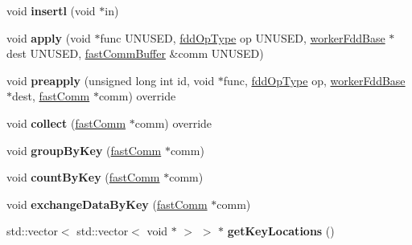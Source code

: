 \begin{DoxyCompactItemize}
void {\bfseries insertl} (void $\ast$in)
\item 
\hypertarget{classfaster_1_1workerFdd_a7b54fa501fd3cd31a27b95cc55b6235a}{}\label{classfaster_1_1workerFdd_a7b54fa501fd3cd31a27b95cc55b6235a} 
void {\bfseries apply} (void $\ast$func U\+N\+U\+S\+ED, \hyperlink{namespacefaster_a64379512d12d41c6e58f176939abfd80}{fdd\+Op\+Type} op U\+N\+U\+S\+ED, \hyperlink{classfaster_1_1workerFddBase}{worker\+Fdd\+Base} $\ast$dest U\+N\+U\+S\+ED, \hyperlink{classfaster_1_1fastCommBuffer}{fast\+Comm\+Buffer} \&comm U\+N\+U\+S\+ED)
\item 
\hypertarget{classfaster_1_1workerFdd_a245c74dd6908a15c8e4310e21c25f867}{}\label{classfaster_1_1workerFdd_a245c74dd6908a15c8e4310e21c25f867} 
void {\bfseries preapply} (unsigned long int id, void $\ast$func, \hyperlink{namespacefaster_a64379512d12d41c6e58f176939abfd80}{fdd\+Op\+Type} op, \hyperlink{classfaster_1_1workerFddBase}{worker\+Fdd\+Base} $\ast$dest, \hyperlink{classfaster_1_1fastComm}{fast\+Comm} $\ast$comm) override
\item 
\hypertarget{classfaster_1_1workerFdd_a429828080212db643940e5761b9bc27c}{}\label{classfaster_1_1workerFdd_a429828080212db643940e5761b9bc27c} 
void {\bfseries collect} (\hyperlink{classfaster_1_1fastComm}{fast\+Comm} $\ast$comm) override
\item 
\hypertarget{classfaster_1_1workerFdd_a4e4649c682140139aa4d8e7612086bfd}{}\label{classfaster_1_1workerFdd_a4e4649c682140139aa4d8e7612086bfd} 
void {\bfseries group\+By\+Key} (\hyperlink{classfaster_1_1fastComm}{fast\+Comm} $\ast$comm)
\item 
\hypertarget{classfaster_1_1workerFdd_a4be02069920848e005273f560e99b3c8}{}\label{classfaster_1_1workerFdd_a4be02069920848e005273f560e99b3c8} 
void {\bfseries count\+By\+Key} (\hyperlink{classfaster_1_1fastComm}{fast\+Comm} $\ast$comm)
\item 
\hypertarget{classfaster_1_1workerFdd_ae64b4a8a3a6d2781cb8ad865f09864c5}{}\label{classfaster_1_1workerFdd_ae64b4a8a3a6d2781cb8ad865f09864c5} 
void {\bfseries exchange\+Data\+By\+Key} (\hyperlink{classfaster_1_1fastComm}{fast\+Comm} $\ast$comm)
\item 
\hypertarget{classfaster_1_1workerFdd_a997160b60444b89810515ad572b0e884}{}\label{classfaster_1_1workerFdd_a997160b60444b89810515ad572b0e884} 
std\+::vector$<$ std\+::vector$<$ void $\ast$ $>$ $>$ $\ast$ {\bfseries get\+Key\+Locations} ()
\item 
\hypertarget{classfaster_1_1workerFdd_aa81abd54c04cac35089ee3c26f156294}{}\label{classfaster_1_1workerFdd_aa81abd54c04cac35089ee3c26f156294} 

\end{DoxyCompactItemize}
